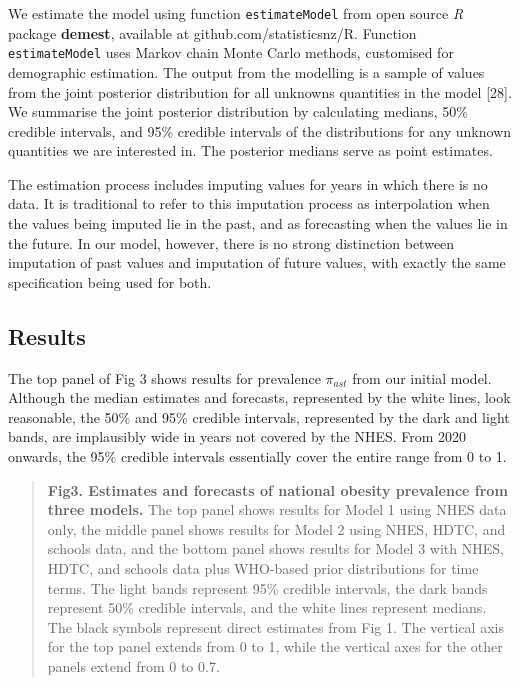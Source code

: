 \documentclass[10pt,letterpaper]{article}
\begin{document}
We estimate the model using function \texttt{estimateModel} from open
source \emph{R} package \textbf{demest}, available at
github.com/statisticsnz/R. Function \texttt{estimateModel} uses Markov
chain Monte Carlo methods, customised for demographic estimation. The
output from the modelling is a sample of values from the joint posterior
distribution for all unknowns quantities in the model {[}28{]}. We
summarise the joint posterior distribution by calculating medians, 50\%
credible intervals, and 95\% credible intervals of the distributions for
any unknown quantities we are interested in. The posterior medians serve
as point estimates.

The estimation process includes imputing values for years in which there
is no data. It is traditional to refer to this imputation process as
interpolation when the values being imputed lie in the past, and as
forecasting when the values lie in the future. In our model, however,
there is no strong distinction between imputation of past values and
imputation of future values, with exactly the same specification being
used for both.

\hypertarget{results}{%
\subsection{Results}\label{results}}

The top panel of Fig 3 shows results for prevalence \(\pi_{ast}\) from
our initial model. Although the median estimates and forecasts,
represented by the white lines, look reasonable, the 50\% and 95\%
credible intervals, represented by the dark and light bands, are
implausibly wide in years not covered by the NHES. From 2020 onwards,
the 95\% credible intervals essentially cover the entire range from 0 to
1.

\begin{quote}
\textbf{Fig3. Estimates and forecasts of national obesity prevalence from three models.} The top panel shows results for Model 1 using NHES data only, the middle panel shows results for Model 2 using NHES, HDTC, and schools data, and the bottom panel shows results for Model 3 with NHES, HDTC, and schools data plus WHO-based prior distributions for time terms.  The light bands represent 95\% credible intervals, the dark bands represent 50\% credible intervals, and the white lines represent medians. The black symbols represent direct estimates from Fig 1. The vertical axis for the top panel extends from 0 to 1, while the vertical axes for the other panels extend from 0 to 0.7.
\end{quote}
\end{document}
